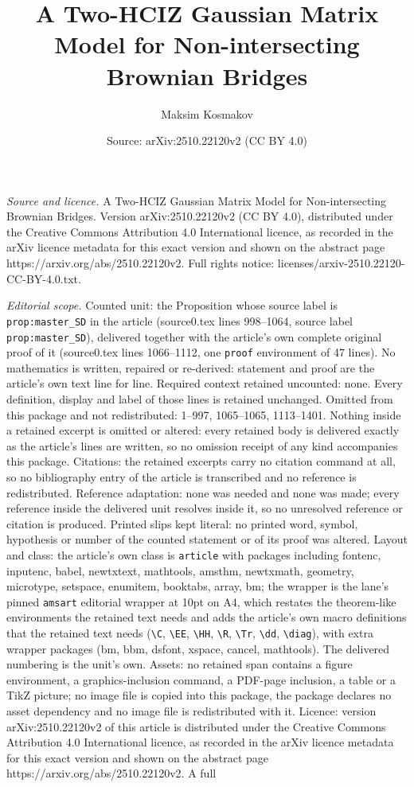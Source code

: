 \documentclass[10pt,a4paper]{amsart}
\title[A Two-HCIZ Gaussian Matrix Model for Non-intersecting Browni]{A Two-HCIZ Gaussian Matrix Model for Non-intersecting Brownian Bridges}
\author{Maksim Kosmakov}
\date{Source: arXiv:2510.22120v2 (CC BY 4.0)}
\begin{document}
\maketitle

\noindent\emph{Source and licence.} A Two-HCIZ Gaussian Matrix Model for Non-intersecting Brownian Bridges. Version arXiv:2510.22120v2 (CC BY 4.0), distributed under the Creative Commons Attribution 4.0 International licence, as recorded in the arXiv licence metadata for this exact version and shown on the abstract page https://arxiv.org/abs/2510.22120v2. Full rights notice: licenses/arxiv-2510.22120-CC-BY-4.0.txt.\par\smallskip

\noindent\textit{Editorial scope.} Counted unit: the Proposition whose source label is \texttt{prop:master\_SD} in the article (source0.tex lines 998--1064, source label \texttt{prop:master\_SD}), delivered together with the article's own complete original proof of it (source0.tex lines 1066--1112, one \texttt{proof} environment of 47 lines). No mathematics is written, repaired or re-derived: statement and proof are the article's own text line for line. Required context retained uncounted: none. Every definition, display and label of those lines is retained unchanged. Omitted from this package and not redistributed: 1--997, 1065--1065, 1113--1401. Nothing inside a retained excerpt is omitted or altered: every retained body is delivered exactly as the article's lines are written, so no omission receipt of any kind accompanies this package. Citations: the retained excerpts carry no citation command at all, so no bibliography entry of the article is transcribed and no reference is redistributed. Reference adaptation: none was needed and none was made; every reference inside the delivered unit resolves inside it, so no unresolved reference or citation is produced. Printed slips kept literal: no printed word, symbol, hypothesis or number of the counted statement or of its proof was altered. Layout and class: the article's own class is \texttt{article} with packages including fontenc, inputenc, babel, newtxtext, mathtools, amsthm, newtxmath, geometry, microtype, setspace, enumitem, booktabs, array, bm; the wrapper is the lane's pinned \texttt{amsart} editorial wrapper at 10pt on A4, which restates the theorem-like environments the retained text needs and adds the article's own macro definitions that the retained text needs (\texttt{\textbackslash C}, \texttt{\textbackslash EE}, \texttt{\textbackslash HH}, \texttt{\textbackslash R}, \texttt{\textbackslash Tr}, \texttt{\textbackslash dd}, \texttt{\textbackslash diag}), with extra wrapper packages (bm, bbm, dsfont, xspace, cancel, mathtools). The delivered numbering is the unit's own. Assets: no retained span contains a figure environment, a graphics-inclusion command, a PDF-page inclusion, a table or a TikZ picture; no image file is copied into this package, the package declares no asset dependency and no image file is redistributed with it. Licence: version arXiv:2510.22120v2 of this article is distributed under the Creative Commons Attribution 4.0 International licence, as recorded in the arXiv licence metadata for this exact version and shown on the abstract page https://arxiv.org/abs/2510.22120v2. A full 
\end{document}
